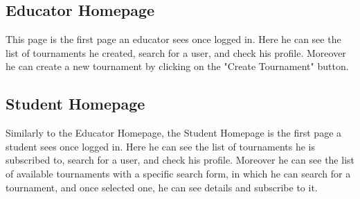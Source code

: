 \subsection{Educator Homepage}
This page is the first page an educator sees once logged in. Here he can see the list of tournaments he created, search for a user, and check his profile. Moreover he can create a new tournament by clicking on the "Create Tournament" button.\\
\clearpage
\subsection{Student Homepage}
Similarly to the Educator Homepage, the Student Homepage is the first page a student sees once logged in. Here he can see the list of tournaments he is subscribed to, search for a user, and check his profile. Moreover he can see the list of available tournaments with a specific search form, in which he can search for a tournament, and once selected one, he can see details and subscribe to it.\\
\clearpage
